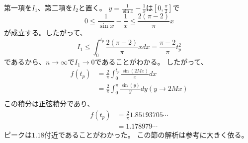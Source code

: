\documentclass{jsarticle}
\begin{document}
第一項を$I_1$、第二項を$I_2$と置く。
$y = \frac{1}{\sin x} - \frac{1}{x}$は$[0, \frac{\pi}{2}]$で
\begin{equation}
    0 \leq \frac{1}{\sin x} - \frac{1}{x} \leq \frac{2(\pi - 2)}{\pi} x
\end{equation}
が成立する。したがって、
\begin{equation}
    I_1 \leq \int^{t_p}_0 \frac{2(\pi - 2)}{\pi} x dx = \frac{\pi - 2}{\pi}t_p^2 
\end{equation}
であるから、$n \rightarrow \infty$で$I_1 \rightarrow 0$であることがわかる。
したがって、
\begin{align}
    f(t_p) &= \frac{2}{\pi}\int^{t_p}_0 
    \frac{\sin (2Mx)}{x} dx\\
    &= \frac{2}{\pi}\int^{\pi}_0 
    \frac{\sin (y)}{y} dy (y \rightarrow 2Mx)\\
\end{align}
この積分は正弦積分であり、
\begin{align}
    f(t_p) &= \frac{2}{\pi} 1.85193705\cdots\\
    &= 1.178979\cdots
\end{align}
ピークは$1.18$付近であることがわかった。
この節の解析は参考\cite{gibbs}に大きく依る。
\end{document}
